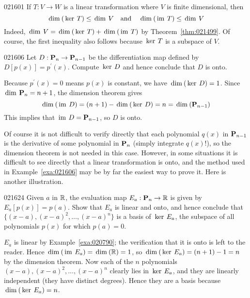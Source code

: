 \begin{example}{}{021601}
If $T : V \to W$ is a linear transformation where $V$ is finite dimensional, then
\begin{equation*}
\thinspace\operatorname{dim\medspace}(\thinspace\operatorname{ker \medspace}T) \leq \thinspace\operatorname{dim \medspace}V \quad \mbox{and} \quad \thinspace\operatorname{dim\medspace}(\thinspace\operatorname{im \medspace}T) \leq \thinspace\operatorname{dim \medspace}V
\end{equation*}
Indeed, $\thinspace\operatorname{dim \medspace}V = \thinspace\operatorname{dim\medspace}(\thinspace\operatorname{ker \medspace}T) + \thinspace\operatorname{dim\medspace}(\thinspace\operatorname{im \medspace}T)$ by Theorem~\ref{thm:021499}. Of course, the first inequality also follows because $\thinspace\operatorname{ker \medspace}T$ is a subspace of $V$.
\end{example}

\begin{example}{}{021606}
Let $D : \textbf{P}_{n} \to \textbf{P}_{n-1}$ be the differentiation map defined by $D\left[p(x)\right] = p^\prime(x)$. Compute $\thinspace\operatorname{ker \medspace}D$ and hence conclude that $D$ is onto.


\begin{solution}
  Because $p^\prime(x) = 0$ means $p(x)$ is constant, we have $\thinspace\operatorname{dim\medspace}(\thinspace\operatorname{ker \medspace}D) = 1$. Since $\thinspace\operatorname{dim \medspace}\textbf{P}_{n} = n + 1$, the dimension theorem gives
\begin{equation*}
\thinspace\operatorname{dim\medspace}(\thinspace\operatorname{im \medspace}D) = (n + 1) - \thinspace\operatorname{dim\medspace}(\thinspace\operatorname{ker \medspace}D) = n = \thinspace\operatorname{dim\medspace}(\textbf{P}_{n-1})
\end{equation*}
This implies that $\thinspace\operatorname{im \medspace}D = \textbf{P}_{n-1}$, so $D$ is onto.
\end{solution}
\end{example}

Of course it is not difficult to verify directly that each polynomial $q(x)$ in $\textbf{P}_{n-1}$ is the derivative of some polynomial in $\textbf{P}_{n}$ (simply integrate $q(x)$!), so the dimension theorem is not needed in this case. However, in some situations it is difficult to see directly that a linear transformation is onto, and the method used in Example~\ref{exa:021606} may be by far the easiest way to prove it. Here is another illustration.


\begin{example}{}{021624}
Given $a$ in $\mathbb{R}$, the evaluation map $E_{a} : \textbf{P}_{n} \to \mathbb{R}$ is given by $E_{a}\left[p(x)\right] = p(a)$. Show that $E_{a}$ is linear and onto, and hence conclude that $\{(x - a), (x - a)^{2}, \dots, (x - a)^{n}\}$ is a basis of $\thinspace\operatorname{ker \medspace}E_{a}$, the subspace of all polynomials $p(x)$ for which $p(a) = 0$.


\begin{solution}
  $E_{a}$ is linear by Example~\ref{exa:020790}; the verification that it is onto is left to the reader. Hence $\thinspace\operatorname{dim\medspace}(\thinspace\operatorname{im \medspace}E_{a}) = \thinspace\operatorname{dim\medspace}(\mathbb{R}) = 1$, so $\thinspace\operatorname{dim\medspace}(\thinspace\operatorname{ker \medspace}E_{a}) = (n + 1) - 1 = n$ by the dimension theorem. Now each of the $n$ polynomials $(x - a), (x - a)^{2}, \dots, (x - a)^{n}$ clearly lies in $\thinspace\operatorname{ker \medspace}E_{a}$, and they are linearly independent (they have distinct degrees). Hence they are a basis because $\thinspace\operatorname{dim\medspace}(\thinspace\operatorname{ker \medspace}E_{a}) = n$.
\end{solution}
\end{example}

